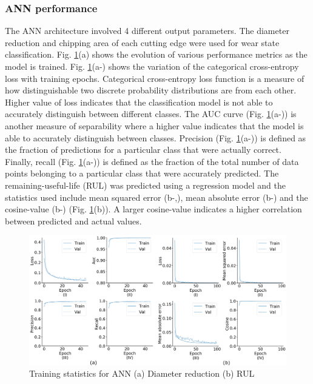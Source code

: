 \documentclass[preprint,review,12pt]{elsarticle}
\newcommand{\RomanNumeralCaps}[1]
    {\MakeUppercase{\romannumeral #1}}
\begin{document}
\subsubsection{ANN performance}
The ANN architecture involved 4 different output parameters. The diameter reduction and chipping area of each cutting edge were used for wear state classification. Fig. \ref{fig:fig55}(a) shows the evolution of various performance metrics as the model is trained. Fig. \ref{fig:fig55}(a-\RomanNumeralCaps{1}) shows the variation of the categorical cross-entropy loss with training epochs. Categorical cross-entropy loss function is a measure of how distinguishable two discrete probability distributions are from each other. Higher value of loss indicates that the classification model is not able to accurately distinguish between different classes. The AUC curve (Fig. \ref{fig:fig55}(a-\RomanNumeralCaps{2})) is another measure of separability where a higher value indicates that the model is able to accurately distinguish between classes. Precision (Fig. \ref{fig:fig55}(a-\RomanNumeralCaps{3})) is defined as the fraction of predictions for a particular class that were actually correct. Finally, recall (Fig. \ref{fig:fig55}(a-\RomanNumeralCaps{4})) is defined as the fraction of the total number of data points belonging to a particular class that were accurately predicted. The remaining-useful-life (RUL) was predicted using a regression model and the statistics used include mean squared error (b-\RomanNumeralCaps{1},\RomanNumeralCaps{2}), mean absolute error (b-\RomanNumeralCaps{3}) and the cosine-value (b-\RomanNumeralCaps{4}) (Fig. \ref{fig:fig55}(b)). A larger cosine-value indicates a higher correlation between predicted and actual values.

\begin{figure}[!h]
  \begin{center}
    \includegraphics[width=\linewidth]{55.png}
    \caption{Training statistics for ANN  (a) Diameter reduction (b) RUL}\label{fig:fig55}
  \end{center}
\end{figure}
\end{document}
